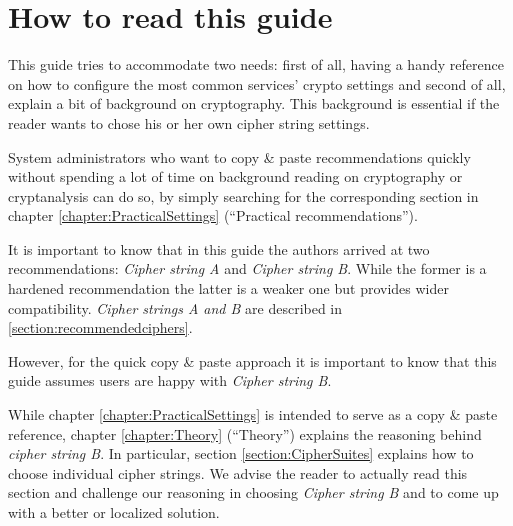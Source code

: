 \section{How to read this guide}
\label{sec:how-read-this}
This guide tries to accommodate two needs: first of all, having a handy reference on how to configure the most common services' crypto settings and second of all, explain a bit of background on cryptography. This background is essential if the reader wants to chose his or her own cipher string settings.

System administrators who want to copy \& paste recommendations quickly without
spending a lot of time on background reading on cryptography or cryptanalysis
can do so, by simply searching for the corresponding section in chapter
\ref{chapter:PracticalSettings} (``Practical recommendations''). 

It is important to know that in this guide the authors arrived at two recommendations: \textit{Cipher string A} and \textit{Cipher string B}. While the former is a hardened recommendation the latter is a weaker one but provides wider compatibility.
\textit{Cipher strings A and B} are described in \ref{section:recommendedciphers}. 


However, for the quick copy \& paste approach it is important to know that this
guide assumes users are happy with \textit{Cipher string B}. 


While chapter \ref{chapter:PracticalSettings} is intended to serve as a copy \& paste reference, chapter \ref{chapter:Theory} (``Theory'') explains the reasoning behind \textit{cipher string B}. In particular, section \ref{section:CipherSuites} explains how to choose individual cipher strings. We advise the reader to actually read this section and challenge our reasoning in choosing \textit{Cipher string B} and to come up with a better  or localized solution.


